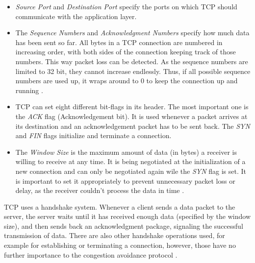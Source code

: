 \documentclass[a4paper,conference]{IEEEtran}
\begin{document}
\begin{itemize}
\item \textit{Source Port} and \textit{Destination Port} specify the ports on which TCP should communicate with the application layer.

\item The \textit{Sequence Numbers} and \textit{Acknowledgment Numbers} specify how much data has been sent so far. All bytes in a TCP connection are numbered in increasing order, with both sides of the connection keeping track of those numbers. This way packet loss can be detected. As the sequence numbers are limited to 32 bit, they cannot increase endlessly. Thus, if all possible sequence numbers are used up, it wraps around to 0 to keep the connection up and running \cite{postel1981transmission}.

\item TCP can set eight different bit-flags in its header. The most important one is the \textit{ACK} flag (Acknowledgement bit). It is used whenever a packet arrives at its destination and an acknowledgement packet has to be sent back. The \textit{SYN} and \textit{FIN} flags initialize and terminate a connection.

\item The \textit{Window Size} is the maximum amount of data (in bytes) a receiver is willing to receive at any time. It is being negotiated at the initialization of a new connection and can only be negotiated again wile the \textit{SYN} flag is set. It is important to set it appropriately to prevent unnecessary packet loss or delay, as the receiver couldn't process the data in time \cite{jacobson1992tcp}.
\end{itemize}
TCP uses a handshake system. Whenever a client sends a data packet to the server, the server waits until it has received enough data (specified by the window size), and then sends back an acknowledgment package, signaling the successful transmission of data. There are also other handshake operations used, for example for establishing or terminating a connection, however, those have no further importance to the congestion avoidance protocol \cite{1209197,jacobson1992tcp,huston2000tcp,jacobson1995congestion}.
\end{document}
